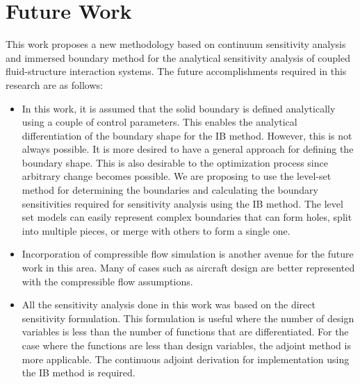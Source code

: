 \section{Future Work}
This work proposes a new methodology based on continuum sensitivity analysis and immersed boundary method for the analytical sensitivity analysis of coupled fluid-structure interaction systems. The future accomplishments required in this research are as follows:
\begin{itemize}
    \item In this work, it is assumed that the solid boundary is defined analytically using a couple of control parameters. This enables the analytical differentiation of the boundary shape for the IB method. However, this is not always possible. It is more desired to have a general approach for defining the boundary shape. This is also desirable to the optimization process since arbitrary change becomes possible. We are proposing to use the level-set method for determining the boundaries and calculating the boundary sensitivities required for sensitivity analysis using the IB method. The level set models can easily represent complex boundaries that can form holes, split into multiple pieces, or merge with others to form a single one.
    \item Incorporation of compressible flow simulation is another avenue for the future work in this area. Many of cases such as aircraft design are better represented with the compressible flow assumptions.
    \item All the sensitivity analysis done in this work was based on the direct sensitivity formulation. This formulation is useful where the number of design variables is less than the number of functions that are differentiated. For the case where the functions are less than design variables, the adjoint method is more applicable. The continuous adjoint derivation for implementation using the IB method is required.
\end{itemize}